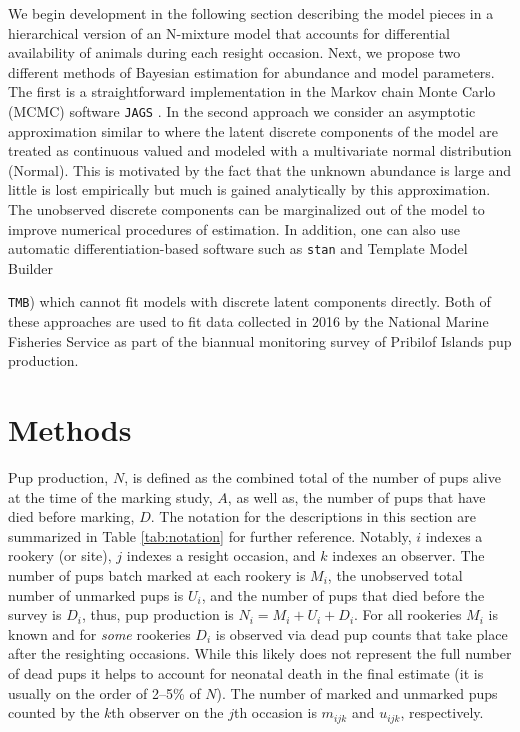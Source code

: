 \documentclass[fleqn,10pt]{wlscirep}
\begin{document}
We begin development in the following section describing the model pieces in a hierarchical version of an N-mixture model \cite{royle2004n} that accounts for differential availability of animals during each resight occasion. Next, we propose two different methods of Bayesian estimation for abundance and model parameters. The first is a straightforward implementation in the Markov chain Monte Carlo (MCMC) software \texttt{JAGS} \cite{plummer2003jags}. In the second approach we consider an asymptotic approximation similar to \cite{brintz2018asymptotic} where the latent discrete components of the model are treated as continuous valued and modeled with a multivariate normal distribution (Normal). This is motivated by the fact that the unknown abundance is large and little is lost empirically but much is gained analytically by this approximation. The unobserved discrete components can be marginalized out of the model to improve numerical procedures of estimation. In addition, one can also use automatic differentiation-based software such as \texttt{stan} \cite{gelman2015stan} and Template Model Builder {{\tt TMB})\cite{kristensen2016tmb} which cannot fit models with discrete latent components directly. Both of these approaches are used to fit data collected in 2016 by the National Marine Fisheries Service as part of the biannual monitoring survey of Pribilof Islands pup production.


\section*{Methods}

Pup production, \(N\), is defined as the combined total of the number of pups alive at the time of the marking study, \(A\), as well as, the number of pups that have died before marking, \(D\). The notation for the descriptions in this section are summarized in Table \ref{tab:notation} for further reference. Notably, \(i\) indexes a rookery (or site), \(j\) indexes a resight occasion, and \(k\) indexes an observer. The number of pups batch marked at each rookery is \(M_i\), the unobserved total number of unmarked pups is \(U_i\), and the number of pups that died before the survey is \(D_i\), thus, pup production is \(N_i = M_i + U_i +D_i\). For all rookeries \(M_i\) is known and for \emph{some} rookeries \(D_i\) is observed via dead pup counts that take place after the resighting occasions. While this likely does not represent the full number of dead pups it helps to account for neonatal death in the final estimate (it is usually on the order of 2--5\% of \(N\)). The number of marked and unmarked pups counted by the \(k\)th observer on the \(j\)th occasion is \(m_{ijk}\) and \(u_{ijk}\), respectively.

}
\end{document}
